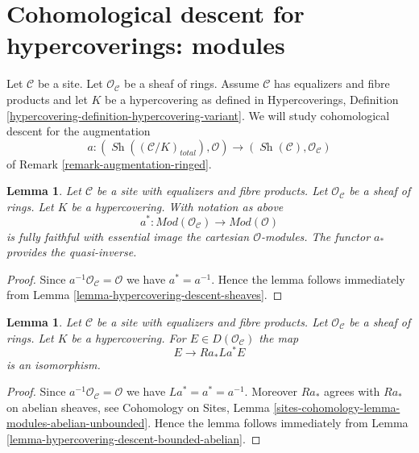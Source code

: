 \documentclass{stacks-project}
\theoremstyle{plain}
\newtheorem{lemma}[subsection]{Lemma}
\theoremstyle{definition}
\theoremstyle{remark}
\numberwithin{equation}{subsection}
\def\Sh{\mathop{\mathit{Sh}}\nolimits}
\begin{document}
\section{Cohomological descent for hypercoverings: modules}
\label{section-cohomological-descent-hypercoverings-modules}

\noindent
Let $\mathcal{C}$ be a site. Let $\mathcal{O}_\mathcal{C}$
be a sheaf of rings. Assume $\mathcal{C}$
has equalizers and fibre products and let $K$ be a hypercovering
as defined in Hypercoverings, Definition
\ref{hypercovering-definition-hypercovering-variant}. We will study
cohomological descent for the augmentation
$$
a :
(\Sh((\mathcal{C}/K)_{total}), \mathcal{O})
\longrightarrow
(\Sh(\mathcal{C}), \mathcal{O}_\mathcal{C})
$$
of Remark \ref{remark-augmentation-ringed}.

\begin{lemma}
\label{lemma-hypercovering-descent-modules}
Let $\mathcal{C}$ be a site with equalizers and fibre products.
Let $\mathcal{O}_\mathcal{C}$ be a sheaf of rings.
Let $K$ be a hypercovering. With notation as above
$$
a^* : \textit{Mod}(\mathcal{O}_\mathcal{C}) \to \textit{Mod}(\mathcal{O})
$$
is fully faithful with essential image the cartesian $\mathcal{O}$-modules.
The functor $a_*$ provides the quasi-inverse.
\end{lemma}

\begin{proof}
Since $a^{-1}\mathcal{O}_\mathcal{C} = \mathcal{O}$ we have
$a^* = a^{-1}$. Hence the lemma follows
immediately from Lemma \ref{lemma-hypercovering-descent-sheaves}.
\end{proof}

\begin{lemma}
\label{lemma-hypercovering-descent-bounded-modules}
Let $\mathcal{C}$ be a site with equalizers and fibre products.
Let $\mathcal{O}_\mathcal{C}$ be a sheaf of rings.
Let $K$ be a hypercovering. For
$E \in D(\mathcal{O}_\mathcal{C})$ the map
$$
E \longrightarrow Ra_*La^*E
$$
is an isomorphism.
\end{lemma}

\begin{proof}
Since $a^{-1}\mathcal{O}_\mathcal{C} = \mathcal{O}$ we have
$La^* = a^* = a^{-1}$. Moreover $Ra_*$ agrees with
$Ra_*$ on abelian sheaves, see
Cohomology on Sites, Lemma
\ref{sites-cohomology-lemma-modules-abelian-unbounded}.
Hence the lemma follows
immediately from Lemma \ref{lemma-hypercovering-descent-bounded-abelian}.
\end{proof}
\end{document}
